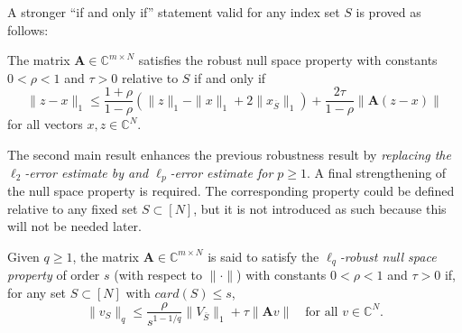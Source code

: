 A stronger ``if and only if'' statement valid for any index set $S$ is proved as follows:
\begin{theorem}
    \label{th0.4.20}
    The matrix $\mathbf{A} \in \mathbb{C}^{m \times N}$ satisfies the robust null space property with constants $0<\rho<1$ and $\tau>0$ relative to $S$ if and only if 
    \begin{equation}
        \|z-x\|_1 \leq \frac{1+\rho}{1-\rho}(\|z\|_1 - \|x\|_1 + 2\|x_{\overline{S}}\|_1) + \frac{2 \tau}{1-\rho}\|\mathbf{A}(z-x)\|
        \label{eq0.4.14}
    \end{equation}
    for all vectors $x, z \in \mathbb{C}^N$.
\end{theorem}


The second main result enhances the previous robustness result by \emph{\textcolor[rgb]{1,0,0}{replacing the $\ell_2$-error estimate by and $\ell_p$-error estimate for $p \geq 1$}}. A final strengthening of the null space property is required. The corresponding property could be defined relative to any fixed set $S \subset [N]$, but it is not introduced as such because this will not be needed later. 

\begin{definition}
    \label{def0.4.21}
    Given $q \geq 1$, the matrix $\mathbf{A} \in \mathbb{C}^{m \times N}$ is said to satisfy the \emph{\textcolor[rgb]{1,0,0}{$\ell_q$-robust null space property}} of order $s$ (with respect to $\|\cdot\|$) with constants $0<\rho<1$ and $\tau>0$ if, for any set $S\subset [N]$ with $card(S) \leq s$,
    \[
        \|v_S\|_q \leq \frac{\rho}{s^{1-1/q}} \|V_{\bar{S}}\|_1 + \tau \|\mathbf{A}v\| \quad \text{for all } v \in \mathbb{C}^N.
    \]
\end{definition}

